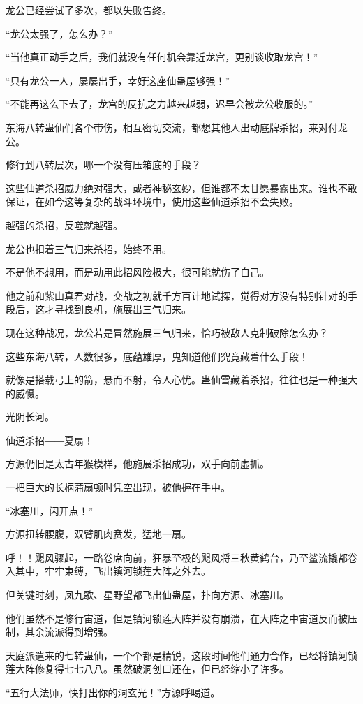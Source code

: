 \begin{this_body}
龙公已经尝试了多次，都以失败告终。

“龙公太强了，怎么办？”

“当他真正动手之后，我们就没有任何机会靠近龙宫，更别谈收取龙宫！”

“只有龙公一人，屡屡出手，幸好这座仙蛊屋够强！”

“不能再这么下去了，龙宫的反抗之力越来越弱，迟早会被龙公收服的。”

东海八转蛊仙们各个带伤，相互密切交流，都想其他人出动底牌杀招，来对付龙公。

修行到八转层次，哪一个没有压箱底的手段？

这些仙道杀招威力绝对强大，或者神秘玄妙，但谁都不太甘愿暴露出来。谁也不敢保证，在如今这等复杂的战斗环境中，使用这些仙道杀招不会失败。

越强的杀招，反噬就越强。

龙公也扣着三气归来杀招，始终不用。

不是他不想用，而是动用此招风险极大，很可能就伤了自己。

他之前和紫山真君对战，交战之初就千方百计地试探，觉得对方没有特别针对的手段后，这才寻找到良机，施展出三气归来。

现在这种战况，龙公若是冒然施展三气归来，恰巧被敌人克制破除怎么办？

这些东海八转，人数很多，底蕴雄厚，鬼知道他们究竟藏着什么手段！

就像是搭载弓上的箭，悬而不射，令人心忧。蛊仙雪藏着杀招，往往也是一种强大的威慑。

光阴长河。

仙道杀招――夏扇！

方源仍旧是太古年猴模样，他施展杀招成功，双手向前虚抓。

一把巨大的长柄蒲扇顿时凭空出现，被他握在手中。

“冰塞川，闪开点！”

方源扭转腰腹，双臂肌肉贲发，猛地一扇。

呼！！飓风骤起，一路卷席向前，狂暴至极的飓风将三秋黄鹤台，乃至鲨流撬都卷入其中，牢牢束缚，飞出镇河锁莲大阵之外去。

但关键时刻，凤九歌、星野望都飞出仙蛊屋，扑向方源、冰塞川。

他们虽然不是修行宙道，但是镇河锁莲大阵并没有崩溃，在大阵之中宙道反而被压制，其余流派得到增强。

天庭派遣来的七转蛊仙，一个个都是精锐，这段时间他们通力合作，已经将镇河锁莲大阵修复得七七八八。虽然破洞创口还在，但已经缩小了许多。

“五行大法师，快打出你的洞玄光！”方源呼喝道。


\end{this_body}
